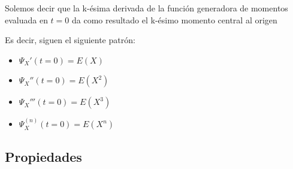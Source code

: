 \documentclass[12pt, fleqn]{report}                             %
\theoremstyle{break}                                            %
\begin{document}
                Solemos decir que la k-ésima derivada de la función generadora
                de momentos evaluada en $t = 0$ da como resultado el k-ésimo momento central al origen

                Es decir, siguen el siguiente patrón:
                \begin{itemize}
                    \item $\Psi_X' (t = 0) = E(X)$ 
                    \item $\Psi_X'' (t = 0) = E(X^2)$ 
                    \item $\Psi_X''' (t = 0) = E(X^3)$ 
                    \item $\Psi_X^{(n)} (t = 0) = E(X^n)$ 
                \end{itemize}



            \clearpage
            \subsection{Propiedades}
\end{document}
